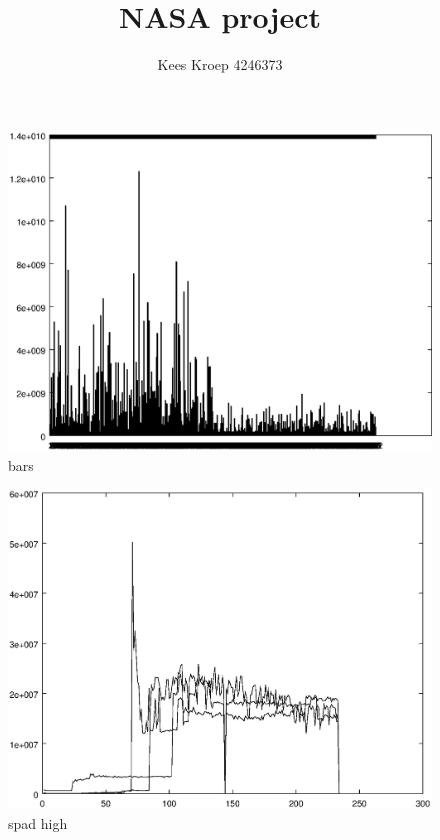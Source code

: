 \documentclass{article}
\title{NASA project}
\author{Kees Kroep 4246373}
\begin{document}


\newpage

\begin{figure}[h]
	\centering
	\includegraphics{measurement/bars}
	\caption{bars
	}
	\label{fig:bars}
\end{figure}


\begin{figure}[h]
	\centering
	\includegraphics{measurement/spad_high}
	\caption{spad high}
	\label{fig:spad_high}
\end{figure}
\end{document}
